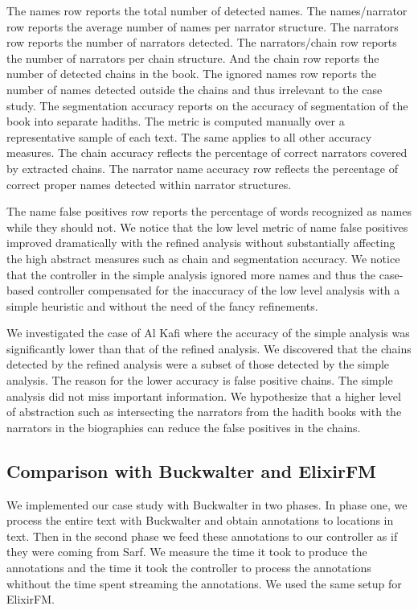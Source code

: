 \documentclass[11pt,letterpaper]{article}
\begin{document}
The names row reports the total number of detected names. The names/narrator row reports the average
number of names per narrator structure. The narrators row reports the number of narrators detected.
The narrators/chain row reports the number of narrators per chain structure. And the chain row reports
the number of detected chains in the book.
The ignored names row reports the number of names detected outside the chains and thus irrelevant to
the case study.
The segmentation accuracy reports on the accuracy of segmentation of the book into separate hadiths.
The metric is computed manually over a representative sample of each text. The same applies to all other accuracy measures.
The chain accuracy reflects the percentage of correct narrators covered by extracted chains.
The narrator name accuracy row reflects the percentage of correct proper names detected within
narrator structures.

The name false positives row reports the percentage of words recognized as names while they should not.
We notice that the low level metric of name false positives improved dramatically with the refined
analysis without substantially affecting the high abstract measures such as chain and segmentation
accuracy.
We notice that the controller in the simple analysis ignored more names and thus the case-based
controller compensated for the inaccuracy of the low level analysis with a simple heuristic and
without the need of the fancy refinements.

We investigated the case of Al Kafi where the accuracy of the simple analysis was significantly lower than that of the refined
analysis. We  discovered that the chains detected by the refined analysis were a subset of those detected by the simple
analysis. 
The reason for the lower accuracy is false positive chains. 
The simple analysis did not miss important information. 
We hypothesize that a higher level of abstraction such as intersecting the narrators from the hadith books with the narrators 
in the biographies can reduce the false positives in the chains.

\subsection{Comparison with Buckwalter and ElixirFM}

We implemented our case study with Buckwalter in two phases. 
In phase one, we process the entire text with Buckwalter and
obtain annotations to locations in text. 
Then in the second phase we feed these annotations to 
our controller as if they were coming from Sarf. 
We measure the time it took to produce the annotations
and the time it took the controller to process the 
annotations whithout the time spent streaming the annotations.
We used the same setup for ElixirFM. 
\end{document}
